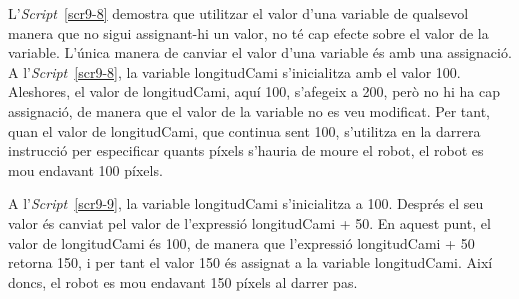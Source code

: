 L'\emph{Script}~\ref{scr9-8} demostra que utilitzar el valor d'una variable de qualsevol manera que no sigui assignant-hi un valor, no té cap efecte sobre el valor de la variable. L'única manera de canviar el valor d'una variable és amb una assignació. A l'\emph{Script}~\ref{scr9-8}, la variable \textsf{longitudCami} s'inicialitza amb el valor \textsf{100}. Aleshores, el valor de \textsf{longitudCami}, aquí \textsf{100}, s'afegeix a \textsf{200}, però no hi ha cap assignació, de manera que el valor de la variable no es veu modificat. Per tant, quan el valor de \textsf{longitudCami}, que continua sent \textsf{100}, s'utilitza en la darrera instrucció per especificar quants píxels s'hauria de moure el robot, el robot es mou endavant \textsf{100} píxels.     

A l'\emph{Script}~\ref{scr9-9}, la variable \textsf{longitudCami} s'inicialitza a \textsf{100}. Després el seu valor és canviat pel valor de l'expressió \textsf{longitudCami + 50}. En aquest punt, el valor de \textsf{longitudCami} és \textsf{100}, de manera que l'expressió \textsf{longitudCami + 50} retorna \textsf{150}, i per tant el valor \textsf{150} és assignat a la variable \textsf{longitudCami}. Així doncs, el robot es mou endavant \textsf{150} píxels al darrer pas.

